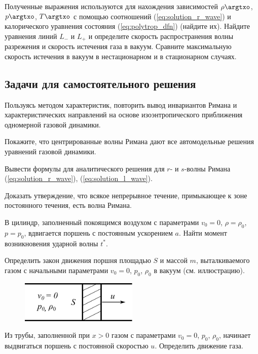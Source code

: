 \documentclass[14pt]{extarticle}
\begin{document}
Полученные выражения используются для нахождения зависимостей $\rho\argtxo$, $p\argtxo$, $T\argtxo$ с помощью соотношений (\ref{eq:solution_r_wave}) и калорического уравнения состояния (\ref{eq:polytrop_dfn}) (найдите их). Найдите уравнения линий $L_-$ и $L_+$ и определите скорость распространения волны разрежения и скорость истечения газа в вакуум. Сравните максимальную скорость истечения в вакуум в нестационарном и в стационарном случаях.

\subsection{Задачи для самостоятельного решения}

\begin{problems}
	
	\item 
	Пользуясь методом характеристик, повторить вывод инвариантов Римана и характеристических направлений на основе изоэнтропического приближения одномерной газовой динамики.
	
	\item 
	Покажите, что центрированные волны Римана дают все автомодельные решения уравнений газовой динамики.	
	
	\item 
	Вывести формулы для аналитического решения для $r$- и $s$-волны Римана (\ref{eq:solution_r_wave}), (\ref{eq:solution_l_wave}).

	\item 
	Доказать утверждение, что всякое непрерывное течение, примыкающее к зоне постоянного течения, есть волна Римана.
	
	
	
	
	\item 
	В цилиндр, заполненный покоящимся воздухом с параметрами $v_0 = 0$, $\rho=\rho_0$, $p=p_0$, вдвигается поршень с постоянным ускорением $a$. Найти момент возникновения ударной волны $t^*$.
	
	\item
	Определить закон движения поршня площадью $S$ и массой $m$, выталкиваемого газом с начальными параметрами $v_0=0$, $p_0$, $\rho_0$ в вакуум (см. иллюстрацию).

	\begin{figure}[h!]
		\centering
		\includegraphics[width=0.5\textwidth]{../img/piston_u.pdf}
	\end{figure}
	
	\item 
	Из трубы, заполненной при $x>0$ газом с параметрами  $v_0=0$, $p_0$, $\rho_0$, начинает выдвигаться поршень с постоянной скоростью $u$. Определить движение газа.

\end{problems}
\end{document}
